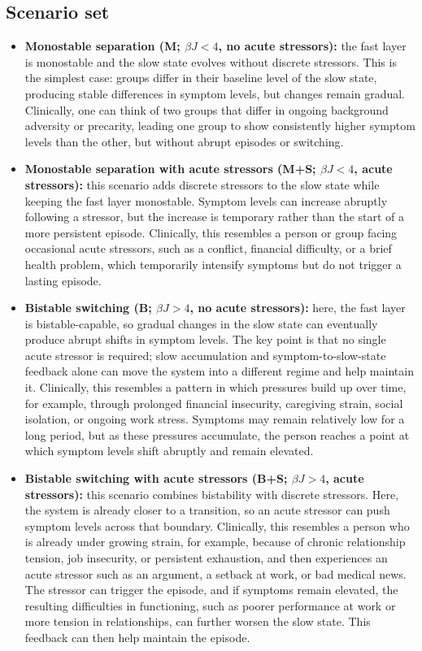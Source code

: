 \documentclass[man,12pt,floatsintext]{apa7}
\begin{document}
\subsection{Scenario set}\label{sec:sim_scenarios}
\begin{itemize}[leftmargin=*]
\item \textbf{Monostable separation (M; \(\beta J<4\), no acute stressors):} the fast layer is monostable and the slow state evolves without discrete stressors. This is the simplest case: groups differ in their baseline level of the slow state, producing stable differences in symptom levels, but changes remain gradual. Clinically, one can think of two groups that differ in ongoing background adversity or precarity, leading one group to show consistently higher symptom levels than the other, but without abrupt episodes or switching.
\item \textbf{Monostable separation with acute stressors (M+S; \(\beta J<4\), acute stressors):} this scenario adds discrete stressors to the slow state while keeping the fast layer monostable. Symptom levels can increase abruptly following a stressor, but the increase is temporary rather than the start of a more persistent episode. Clinically, this resembles a person or group facing occasional acute stressors, such as a conflict, financial difficulty, or a brief health problem, which temporarily intensify symptoms but do not trigger a lasting episode.
\item \textbf{Bistable switching (B; \(\beta J>4\), no acute stressors):} here, the fast layer is bistable-capable, so gradual changes in the slow state can eventually produce abrupt shifts in symptom levels. The key point is that no single acute stressor is required; slow accumulation and symptom-to-slow-state feedback alone can move the system into a different regime and help maintain it. Clinically, this resembles a pattern in which pressures build up over time, for example, through prolonged financial insecurity, caregiving strain, social isolation, or ongoing work stress. Symptoms may remain relatively low for a long period, but as these pressures accumulate, the person reaches a point at which symptom levels shift abruptly and remain elevated.
\item \textbf{Bistable switching with acute stressors (B+S; \(\beta J>4\), acute stressors):} this scenario combines bistability with discrete stressors. Here, the system is already closer to a transition, so an acute stressor can push symptom levels across that boundary. Clinically, this resembles a person who is already under growing strain, for example, because of chronic relationship tension, job insecurity, or persistent exhaustion, and then experiences an acute stressor such as an argument, a setback at work, or bad medical news. The stressor can trigger the episode, and if symptoms remain elevated, the resulting difficulties in functioning, such as poorer performance at work or more tension in relationships, can further worsen the slow state. This feedback can then help maintain the episode.
\end{itemize}
\end{document}
